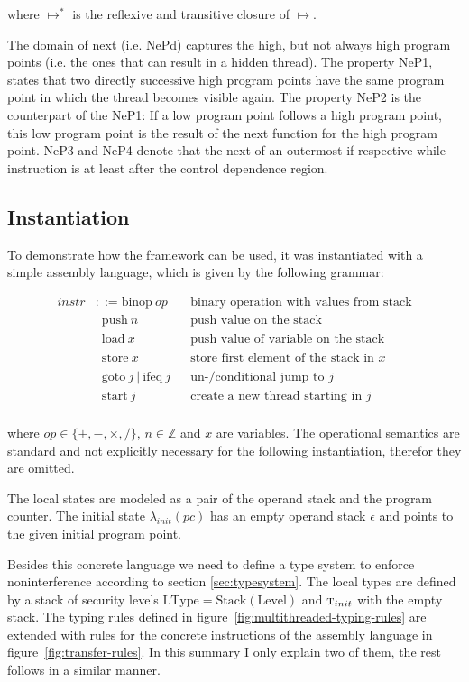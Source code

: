 \documentclass[a4paper,10pt]{llncs}
\begin{document}
where $\mapsto^*$ is the reflexive and transitive closure of $\mapsto$.

The domain of next (i.e. NePd) captures the high, but not always high program points (i.e. the ones
that can result in a hidden thread). The property NeP1, states that two directly successive high
program points have the same program point in which the thread becomes visible again. The property NeP2
is the counterpart of the NeP1: If a low program point follows a high program point, this low program
point is the result of the next function for the high program point. NeP3 and NeP4 denote that the
next of an outermost if respective while instruction is at least after the control dependence region.

\newpage
\subsection{Instantiation}
\label{sec:instantiation}
To demonstrate how the framework can be used, it was instantiated with a simple
assembly language, which is given by the following grammar:

\begin{align*}
instr &::= \text{binop}\ op && \text{binary operation with values from stack} \\
&|\ \text{push}\ n &&  \text{push value on the stack} \\
&|\ \text{load}\ x && \text{push value of variable on the stack} \\
&|\ \text{store}\ x && \text{store first element of the stack in $x$} \\
&|\ \text{goto}\ j\ |\ \text{ifeq}\ j && \text{un-/conditional jump to $j$} \\
&|\ \text{start}\ j && \text{create a new thread starting in $j$} \\
\end{align*}

where $op \in \{+,-,\times,/\}$, $n \in \mathbb{Z}$ and $x$ are variables. The
operational semantics are standard and not explicitly necessary for the following
instantiation, therefor they are omitted.

The local states are modeled as a pair of the operand stack and the program counter. The
initial state $\lambda_{init}(pc)$ has an empty operand stack $\epsilon$ and points to
the given initial program point.

Besides this concrete language we need to define a type system to enforce noninterference
according to section \ref{sec:typesystem}. The local types are defined by a stack of security levels
$\text{LType} = \text{Stack}(\text{Level})$ and $\textsc{t}_{init}$ with the empty stack. The typing rules defined in
figure~\ref{fig:multithreaded-typing-rules} are extended with rules for the concrete instructions
of the assembly language in figure~\ref{fig:transfer-rules}. In this summary I only explain two of them, the rest follows
in a similar manner.
\end{document}
